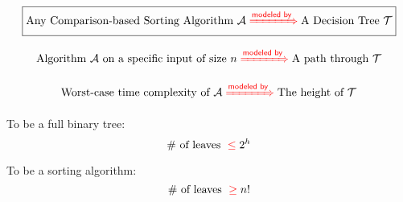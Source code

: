 \begin{frame}{}
  \begin{center}
    {\Large {}} 
  \end{center}

  \vspace{-0.40cm}
  \[
    \boxed{\text{Any Comparison-based Sorting Algorithm } \mathcal{A} \;\textcolor{red}{\xRightarrow{\textsf{modeled by}}}\; \text{A Decision Tree } \mathcal{T}}
  \]

  \pause
  \[
    \text{Algorithm $\mathcal{A}$ on a specific input of size } n \;\textcolor{red}{\xRightarrow{\textsf{modeled by}}}\; \text{A path through } \mathcal{T}
  \]

  \pause
  \[
    \text{Worst-case time complexity of $\mathcal{A}$} \;\textcolor{red}{\xRightarrow{\textsf{modeled by}}}\; \text{The height of } \mathcal{T}
  \]

  \pause
  \vspace{0.50cm}
  \centering
\end{frame}

\begin{frame}{}
  \begin{center}
    {\Large {}} 
  \end{center}

  \centering
  \vspace{0.30cm}

  \pause
  \vspace{0.30cm}
  \begin{alertblock}{To be a full binary tree:}
    \[
      \# \text{ of leaves } \;\textcolor{red}{\le}\; 2^h
    \]
  \end{alertblock}

  \pause
  \vspace{0.50cm}
  \begin{alertblock}{To be a  sorting algorithm:}
    \[
      \# \text{ of leaves } \;\textcolor{red}{\ge}\; n!
    \]
  \end{alertblock}
\end{frame}

